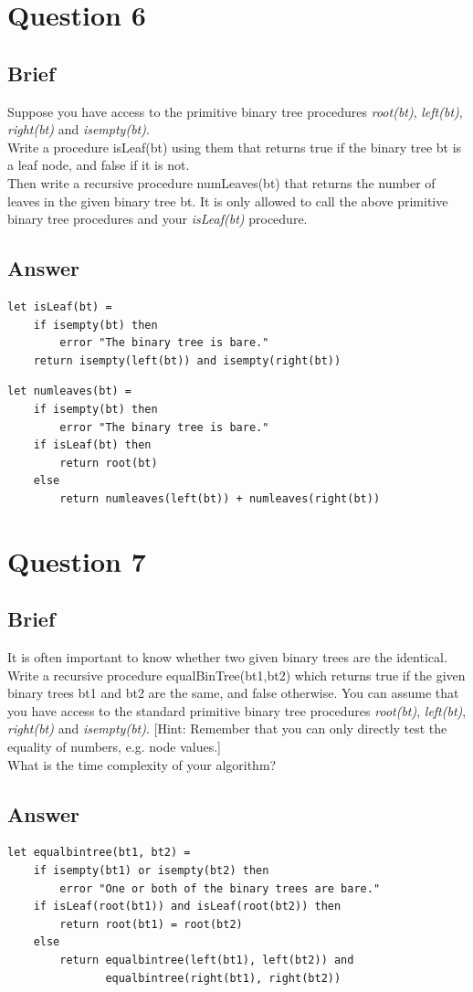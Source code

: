 \documentclass{article}
\begin{document}
\section{Question 6}
\subsection{Brief}
Suppose you have access to the primitive binary tree procedures \textit{root(bt)}, \textit{left(bt)}, \textit{right(bt)} and \textit{isempty(bt)}. 
\\ \newline
Write a procedure isLeaf(bt) using them that returns true
if the binary tree bt is a leaf node, and false if it is not.
\\ \newline
Then write a recursive procedure numLeaves(bt) that returns the number of leaves in the given binary tree bt. It is only allowed to call the above primitive binary tree procedures and your \textit{isLeaf(bt)} procedure.
\newpage
\subsection{Answer}
\begin{lstlisting}
let isLeaf(bt) =
    if isempty(bt) then
        error "The binary tree is bare."
    return isempty(left(bt)) and isempty(right(bt))
\end{lstlisting}
\begin{lstlisting}
let numleaves(bt) =
    if isempty(bt) then
        error "The binary tree is bare."
    if isLeaf(bt) then
        return root(bt)
    else
        return numleaves(left(bt)) + numleaves(right(bt))
\end{lstlisting}
\section{Question 7}
\subsection{Brief}
It is often important to know whether two given binary trees are the identical. Write a
recursive procedure equalBinTree(bt1,bt2) which returns true if the given binary trees bt1 and bt2 are the same, and false otherwise. You can assume that you have
access to the standard primitive binary tree procedures \textit{root(bt)}, \textit{left(bt)}, \textit{right(bt)} and \textit{isempty(bt)}. [Hint: Remember that you can only directly test the equality of numbers, e.g. node values.]
\\ \newline
What is the time complexity of your algorithm?
\subsection{Answer}
\begin{lstlisting}
let equalbintree(bt1, bt2) =
    if isempty(bt1) or isempty(bt2) then
        error "One or both of the binary trees are bare."
    if isLeaf(root(bt1)) and isLeaf(root(bt2)) then
        return root(bt1) = root(bt2)
    else
        return equalbintree(left(bt1), left(bt2)) and 
               equalbintree(right(bt1), right(bt2))
\end{lstlisting}
\end{document}
